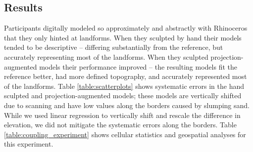 \documentclass[prodmode,acmtochi]{acmsmall} %
\begin{document}
\subsection{Results}
%
Participants digitally modeled so approximately and abstractly 
with Rhinoceros
that they only hinted at landforms. %
%
When they sculpted by hand
their models tended to be descriptive -- 
differing substantially from the reference, but
accurately representing most of the landforms. 
%
When they sculpted projection-augmented models 
their performance improved --
the resulting models
fit the reference better, 
had more defined topography, 
and accurately represented most of the landforms.
%
Table \ref{table:scatterplots} shows systematic errors
in the hand sculpted and projection-augmented models;
these models are vertically shifted due to scanning
and have low values along the borders
caused by slumping sand. 
While we used linear regression 
to vertically shift and rescale the difference in elevation, 
we did not mitigate the systematic errors
along the borders. 
%
Table \ref{table:coupling_experiment} shows cellular statistics 
and geospatial analyses for this experiment.
\end{document}
